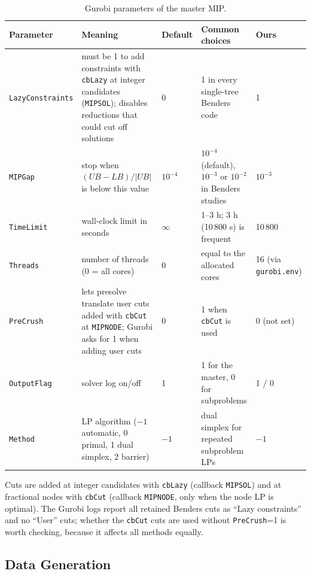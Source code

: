 \begin{table}[h]
\centering
\caption{Gurobi parameters of the master MIP.}\label{tab:gurobi}
\scriptsize
\setlength{\tabcolsep}{3pt}
\begin{tabular}{p{2.1cm}p{4.3cm}p{1.2cm}p{2.2cm}p{1.6cm}}
\toprule
Parameter & Meaning & Default & Common choices & Ours\\
\midrule
\texttt{LazyConstraints} & must be 1 to add constraints with \texttt{cbLazy} at integer candidates (\texttt{MIPSOL}); disables reductions that could cut off solutions & 0 & 1 in every single-tree Benders code & 1\\
\texttt{MIPGap} & stop when $(UB-LB)/|UB|$ is below this value & $10^{-4}$ & $10^{-4}$ (default), $10^{-3}$ or $10^{-2}$ in Benders studies & $10^{-3}$\\
\texttt{TimeLimit} & wall-clock limit in seconds & $\infty$ & 1--3 h; 3 h (10\,800 s) is frequent & 10\,800\\
\texttt{Threads} & number of threads (0 = all cores) & 0 & equal to the allocated cores & 16 (via \texttt{gurobi.env})\\
\texttt{PreCrush} & lets presolve translate user cuts added with \texttt{cbCut} at \texttt{MIPNODE}; Gurobi asks for 1 when adding user cuts & 0 & 1 when \texttt{cbCut} is used & 0 (not set)\\
\texttt{OutputFlag} & solver log on/off & 1 & 1 for the master, 0 for subproblems & 1 / 0\\
\texttt{Method} & LP algorithm ($-1$ automatic, 0 primal, 1 dual simplex, 2 barrier) & $-1$ & dual simplex for repeated subproblem LPs & $-1$\\
\bottomrule
\end{tabular}
\end{table}

Cuts are added at integer candidates with \texttt{cbLazy} (callback \texttt{MIPSOL}) and at fractional nodes with \texttt{cbCut} (callback \texttt{MIPNODE}, only when the node LP is optimal). The Gurobi logs report all retained Benders cuts as ``Lazy constraints'' and no ``User'' cuts; whether the \texttt{cbCut} cuts are used without \texttt{PreCrush}=1 is worth checking, because it affects all methods equally.

\subsection{Data Generation}\label{app:datagen}

